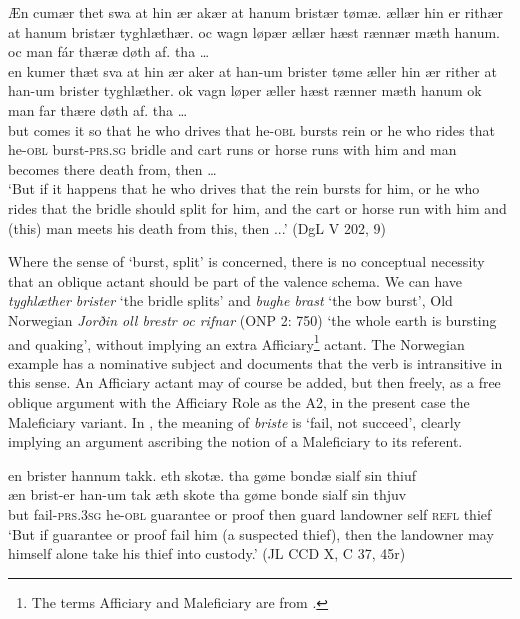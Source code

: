 \documentclass[output=paper]{langscibook}
\begin{document}
\begin{exe}
\ex  \label{ex:heltoft:32}
    \glll Æn cumær thet swa at hin ær akær at hanum bristær tømæ. ællær hin  er rithær at hanum bristær tyghlæthær. oc wagn løpær ællær  hæst rænnær mæth hanum. oc man fár thæræ døth af. tha …\\
        en kumer thæt sva at hin ær aker   at     han-um   brister  tøme   æller hin  ær rither at     han-um   brister       tyghlæther.  ok vagn løper æller hæst rænner   mæth hanum ok man far thære døth af. tha …\\
        but comes it so that he who drives  that   he-\textsc{obl}    bursts  rein  or he  who rides   that   he-\textsc{obl}    burst-\textsc{prs.sg}  bridle      and cart runs or horse runs       with him and man becomes there death from, then …\\
    \glt ‘But if it happens that he who drives  that the rein bursts for him, or he who rides that the bridle should split for him, and the cart or horse run with him and (this) man meets his death from this, then ...' (DgL V 202, 9) 
\end{exe}

Where the sense of ‘burst, split' is concerned, there is no conceptual necessity that an oblique actant should be part of the valence schema. We can have \textit{tyghlæther brister} ‘the bridle splits' and \textit{bughe brast} ‘the bow burst', Old Norwegian \textit{Jorðin oll brestr oc rifnar} (ONP 2: 750) ‘the whole earth is bursting and quaking', without implying an extra Afficiary\footnote{The terms Afficiary and Maleficiary are from \citet{Zúñiga2011}.} actant. The Norwegian example has a nominative subject and documents that the verb is intransitive in this sense. An Afficiary actant may of course be added, but then freely, as a free oblique argument with the Afficiary Role as the A2, in the present case the Maleficiary variant. In , the meaning of \textit{briste} is ‘fail, not succeed', clearly implying an argument ascribing the notion of a Maleficiary to its referent.    

\begin{exe}
\ex \label{ex:heltoft:33}
    \glll en  brister hannum takk. eth skotæ. tha gøme  bondæ sialf sin thiuf\\
         æn   brist-er    han-um    tak      æth skote  tha   gøme  bonde sialf  sin     thjuv\\ 
         but fail-\textsc{prs.3sg}  he-\textsc{obl}    guarantee  or proof  then   guard   landowner self  \textsc{refl}  thief\\
    \glt `But if guarantee or proof fail him (a suspected thief), then the landowner may himself alone take his thief into custody.' (JL CCD X, C 37, 45r)
\end{exe}
\end{document}
